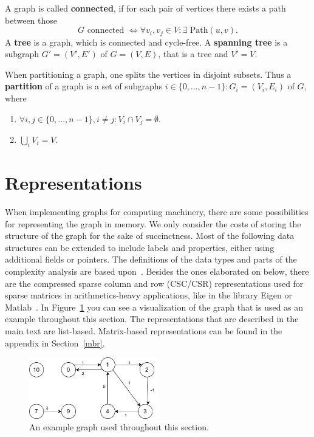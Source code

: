         A graph is called \textbf{connected}, if for each pair of vertices there exists a path between those
        \[G \text{ connected } \Leftrightarrow \forall v_i, v_j \in V: \exists \text{ Path}(u, v).\]
        A \textbf{tree} is a graph, which is connected and cycle-free. 
        A \textbf{spanning tree} is a subgraph $G' = (V', E')$ of $G = (V, E)$, that is a tree and $V' = V$. 
        
        When partitioning a graph, one splits the vertices in disjoint subsets. 
        Thus a \textbf{partition} of a graph is a set of subgraphs $i\in \{0, \dots, n-1\}: G_i = (V_i, E_i)$ of $G$, where 
        \begin{enumerate}
            \item $\forall i,j \in \{0, \dots, n-1\}, i \neq j: V_i \cap V_j = \emptyset$.
            \item $\bigcup_i V_i = V$.
        \end{enumerate}
            
    \section{Representations}\label{\positionnumber}
        When implementing graphs for computing machinery, there are some possibilities for representing the graph in memory.
        We only consider the costs of storing the structure of the graph for the sake of succinctness. 
        Most of the following data structures can be extended to include labels and properties, either using additional fields or pointers. 
        The definitions of the data types and parts of the complexity analysis are based upon~\autocite{Gross1998GraphTA, aho1974design, cormen2009introduction, Goodrich2014AlgorithmDA, steinhaus2010g}. 
        Besides the ones elaborated on below, there are the compressed sparse column and row (CSC/CSR) representations used for sparse matrices in arithmetics-heavy applications, like in the library Eigen or Matlab~\autocite{steinhaus2010g, Eisenstat1982YaleSM}. In Figure~\ref{data_struct-ex} you can see a visualization of the graph that is used as an example throughout this section. The representations that are described in the main text are list-based. Matrix-based representations can be found in the appendix in Section~\ref{mbr}.
        
        \begin{figure}[htp]
            \begin{center}
                \includegraphics[keepaspectratio,width=0.5\textwidth]{img/03-graphs/data_struct_gr.png}
            \end{center}
            \caption{An example graph used throughout this section.} 
            \label{data_struct-ex}
        \end{figure}
        

